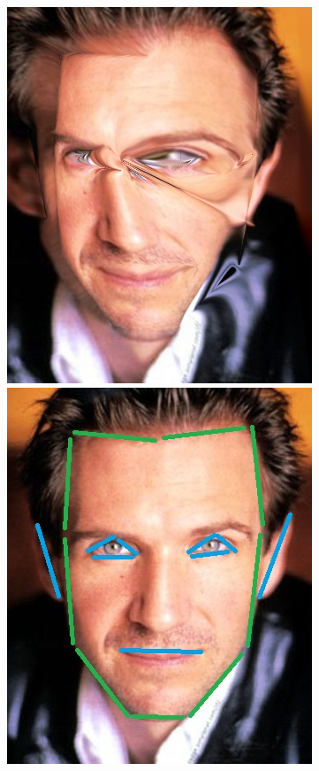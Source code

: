 \documentclass[conference]{IEEEtran}
\begin{document}
\begin{figure}[H]
\begin{multicols}{3}
    \centering
    \includegraphics[width=0.65\linewidth]{extra/errors/01/img01.png} \par
    \includegraphics[width=0.65\linewidth]{extra/errors/01/1 lines.jpg} \par

\end{multicols}
\end{figure}
\end{document}

